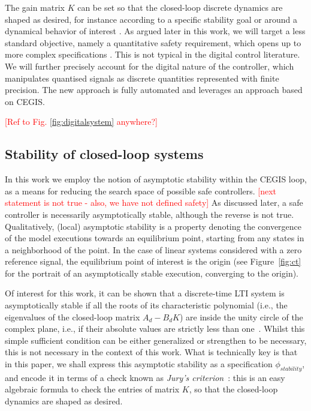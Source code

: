 \documentclass[twocolumn]{autart}    %
\renewcommand{\note}[1]{\textcolor{red}{[#1]}}
\begin{document}
The gain matrix $K$ can be set so that the closed-loop discrete dynamics are
shaped as desired, for instance according to a specific stability goal or
around a dynamical behavior of interest \cite{astrom1997computer}.  As argued
later in this work, we will target a less standard objective,
namely a quantitative safety requirement, which opens up to more complex specifications \cite{BYG16, Tab09}. 
This is not typical in the digital control literature. We will further precisely account for the digital nature
of the controller, which manipulates quantised signals as discrete quantities represented with
finite precision. The new approach is fully automated and leverages an approach based on CEGIS. 


\note{Ref to Fig. \ref{fig:digitalsystem} anywhere?}

\subsection{Stability of closed-loop systems}

In this work we employ the notion of asymptotic stability within the CEGIS loop,  
as a means for reducing the search space of possible safe controllers. 
\note{next statement is not true - also, we have not defined safety} 
As discussed later, a safe controller is necessarily asymptotically stable, although the reverse is not true. 
Qualitatively, (local) asymptotic stability is a property denoting the convergence of the model executions towards an equilibrium point, 
starting from any states in a neighborhood of the point. 
In the case of linear systems %
considered with a zero reference signal, 
the equilibrium point of interest is the origin (see Figure~\ref{fig:ct} for the portrait of an asymptotically stable execution, converging to the origin). 

Of interest for this work, 
it can be shown that a discrete-time LTI system %
is asymptotically stable if all the roots of its characteristic polynomial (i.e., the
eigenvalues of the closed-loop matrix $A_d - B_d K$) are inside the unity
circle of the complex plane, i.e., if their absolute values are strictly less than
one~\cite{astrom1997computer}. 
Whilst this simple sufficient condition can be either generalized or strengthen to be necessary, 
this is not necessary in the context of this work.    
What is technically key is that in this paper, 
we shall express this asymptotic stability as a specification $\phi_\mathit{stability}$, 
and encode it in terms of a check known as \emph{Jury's criterion}~\cite{fadali}: 
this is an easy algebraic formula to check the entries of matrix $K$, 
so that the closed-loop dynamics are shaped as desired. 
\end{document}
